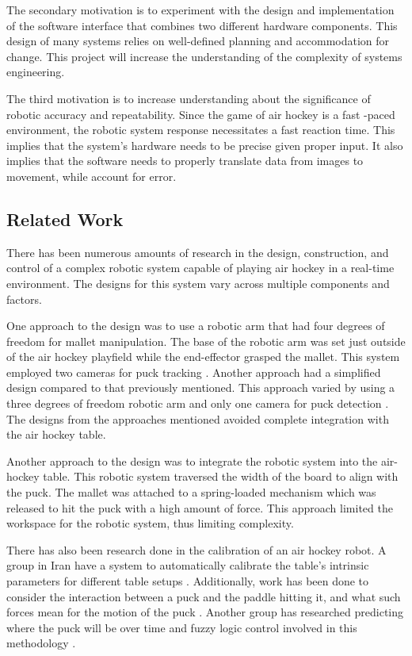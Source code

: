 \documentclass[letterpaper, 12 pt, conference]{ieeeconf}
\begin{document}
The secondary motivation is to experiment with the design and implementation of the software interface that combines two different hardware components. This design of many systems relies on well-defined planning and accommodation for change. This project will increase the understanding of the complexity of systems engineering.

The third motivation is to increase understanding about the significance of robotic accuracy and repeatability. Since the game of air hockey is a fast -paced environment, the robotic system response necessitates a fast reaction time.  This implies that the system’s hardware needs to be precise given proper input.  It also implies that the software needs to properly translate data from images to movement, while account for error.

\subsection{Related Work}
\label{relatedwork}
There has been numerous amounts of research in the design, construction, and control of a complex robotic system capable of playing air hockey in a real-time environment. The designs for this system vary across multiple components and factors.

One approach to the design was to use a robotic arm that had four degrees of freedom for mallet manipulation.  The base of the robotic arm was set just outside of the air hockey playfield while the end-effector grasped the mallet.  This system employed two cameras for puck tracking \cite{namiki}. Another approach had a simplified design compared to that previously mentioned. This approach varied by using a three degrees of freedom robotic arm and only one camera for puck detection \cite{bishop}. The designs from the approaches mentioned avoided complete integration with the air hockey table.

Another approach to the design was to integrate the robotic system into the air-hockey table.  This robotic system traversed the width of the board to align with the puck. The mallet was attached to a spring-loaded mechanism which was released to hit the puck with a high amount of force. This approach limited the workspace for the robotic system, thus limiting complexity.

There has also been research done in the calibration of an air hockey robot. A group in Iran have a system to automatically calibrate the table’s intrinsic parameters for different table setups \cite{alizadeh}.  Additionally, work has been done to consider the interaction between a puck and the paddle hitting it, and what such forces mean for the motion of the puck \cite{ghazvini} \cite{iguchi}. Another group has researched predicting where the puck will be over time and fuzzy logic control involved in this methodology \cite{wang}.
\end{document}
